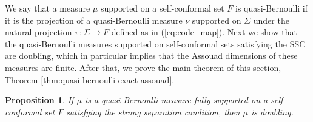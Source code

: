 \documentclass{PRM}
\theoremstyle{plain}
\newtheorem{prop}[thm]{Proposition}
\theoremstyle{definition}
\theoremstyle{remark}
\begin{document}
We say that a measure $\mu$ supported on a self-conformal set $F$ is quasi-Bernoulli if it is the projection of a quasi-Bernoulli measure $\nu$ supported on $\Sigma$ under the natural projection $\pi\colon\Sigma\to F$ defined as in (\ref{eq:code_map}). Next we show that the quasi-Bernoulli measures supported on self-conformal sets satisfying the SSC are doubling, which in particular implies that the Assouad dimensions of these measures are finite. After that, we prove the main theorem of this section, Theorem \ref{thm:quasi-bernoulli-exact-assouad}.
\begin{prop}\label{prop:doubling}
If $\mu$ is a quasi-Bernoulli measure fully supported on a self-conformal set $F$ satisfying the strong separation condition, then $\mu$ is doubling.
\end{prop}
\end{document}
